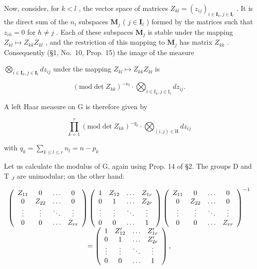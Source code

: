 Now, consider, for \(k < l\) , the vector space of matrices \(Z_{kl} = (z_{ij})_{i \in \mathbf{I}_k, j \in \mathbf{I}_l}\) . It is the direct sum of the \(n_l\) subspaces \(\mathbf{M}_j\) ( \(j \in \mathbf{I}_l\) ) formed by the matrices such that \(z_{ih} = 0\) for \(h \neq j\) . Each of these subspaces \(\mathbf{M}_j\) is stable under the mapping \(Z_{kl} \mapsto Z_{kk}Z_{kl}\) , and the restriction of this mapping to \(\mathbf{M}_j\) has matrix \(Z_{kk}\) . Consequently (§1, No.~10, Prop. 15) the image of the measure

\(\bigotimes_{i \in \mathbf{I}_k, j \in \mathbf{I}_l} dz_{ij}\) under the mapping \(Z_{kl} \mapsto Z_{kk} Z_{kl}\) is

\[
(\mathrm{mod} \det Z _ {k k}) ^ {- n _ {l}} \cdot \bigotimes_ {i \in \mathrm{I} _ {k}, j \in \mathrm{I} _ {l}} d z _ {i j}.
\]

A left Haar measure on G is therefore given by

\[
\prod_ {k = 1} ^ {r} (\mathrm{mod} \det Z _ {k k}) ^ {- q _ {k}} \cdot \bigotimes_ {(i, j) \in \mathrm{H}} d z _ {i j}\tag{9}
\]

with \(q_{k} = \sum_{k\leqslant l\leqslant r}n_{l} = n - p_{k}\)

Let us calculate the modulus of G, again using Prop. 14 of §2. The groups D and T \(_{J}\) are unimodular; on the other hand:

\[
\begin{array}{c} \left( \begin{array}{c c c c} Z _ {1 1} & 0 & \ldots & 0 \\ 0 & Z _ {2 2} & \ldots & 0 \\ \vdots & \vdots & \ddots & \vdots \\ 0 & 0 & \ldots & Z _ {r r} \end{array} \right) \left( \begin{array}{c c c c} 1 & Z _ {1 2} & \ldots & Z _ {1 r} \\ 0 & 1 & \ldots & Z _ {2 r} \\ \vdots & \vdots & \ddots & \vdots \\ 0 & 0 & \ldots & 1 \end{array} \right) \left( \begin{array}{c c c c} Z _ {1 1} & 0 & \ldots & 0 \\ 0 & Z _ {2 2} & \ldots & 0 \\ \vdots & \vdots & \ddots & \vdots \\ 0 & 0 & \ldots & Z _ {r r} \end{array} \right) ^ {- 1} \\ = \left( \begin{array}{c c c c} 1 & Z _ {1 2} ^ {\prime} & \ldots & Z _ {1 r} ^ {\prime} \\ 0 & 1 & \ldots & Z _ {2 r} ^ {\prime} \\ \vdots & \vdots & \ddots & \vdots \\ 0 & 0 & \ldots & 1 \end{array} \right), \end{array}
\]

